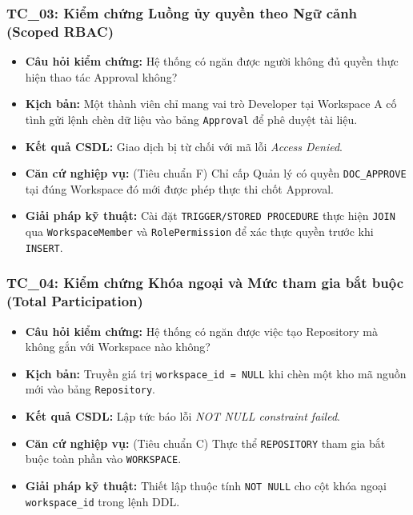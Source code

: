 \subsubsection*{TC\_03: Kiểm chứng Luồng ủy quyền theo Ngữ cảnh (Scoped RBAC)}
\begin{itemize}
    \item \textbf{Câu hỏi kiểm chứng:} Hệ thống có ngăn được người không đủ quyền thực hiện thao tác Approval không?
    \item \textbf{Kịch bản:} Một thành viên chỉ mang vai trò Developer tại Workspace A cố tình gửi lệnh chèn dữ liệu vào bảng \texttt{Approval} để phê duyệt tài liệu.
    \item \textbf{Kết quả CSDL:} Giao dịch bị từ chối với mã lỗi \textit{Access Denied}.
    \item \textbf{Căn cứ nghiệp vụ:} (Tiêu chuẩn F) Chỉ cấp Quản lý có quyền \texttt{DOC\_APPROVE} tại đúng Workspace đó mới được phép thực thi chốt Approval.
    \item \textbf{Giải pháp kỹ thuật:} Cài đặt \texttt{TRIGGER/STORED PROCEDURE} thực hiện \texttt{JOIN} qua \texttt{WorkspaceMember} và \texttt{RolePermission} để xác thực quyền trước khi \texttt{INSERT}.
\end{itemize}

\subsubsection*{TC\_04: Kiểm chứng Khóa ngoại và Mức tham gia bắt buộc (Total Participation)}
\begin{itemize}
    \item \textbf{Câu hỏi kiểm chứng:} Hệ thống có ngăn được việc tạo Repository mà không gắn với Workspace nào không?
    \item \textbf{Kịch bản:} Truyền giá trị \texttt{workspace\_id = NULL} khi chèn một kho mã nguồn mới vào bảng \texttt{Repository}.
    \item \textbf{Kết quả CSDL:} Lập tức báo lỗi \textit{NOT NULL constraint failed}.
    \item \textbf{Căn cứ nghiệp vụ:} (Tiêu chuẩn C) Thực thể \texttt{REPOSITORY} tham gia bắt buộc toàn phần vào \texttt{WORKSPACE}.
    \item \textbf{Giải pháp kỹ thuật:} Thiết lập thuộc tính \texttt{NOT NULL} cho cột khóa ngoại \texttt{workspace\_id} trong lệnh DDL.
\end{itemize}


